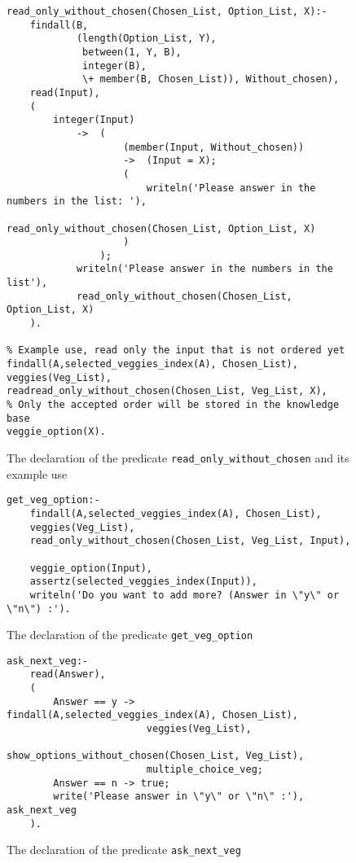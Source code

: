 \documentclass[12pt,a4paper]{article}
\newcommand{\varname}[1]{\texttt{#1}}
\newcommand{\predname}[1]{{\color{MidnightBlue}\varname{#1}}}
\begin{document}
\begin{figure}[H]
	\centering
\begin{lstlisting}[style=Prolog-pygsty]
% Define read_only_without_chosen
read_only_without_chosen(Chosen_List, Option_List, X):- 
    findall(B,
            (length(Option_List, Y),
             between(1, Y, B),
             integer(B),
             \+ member(B, Chosen_List)), Without_chosen),
    read(Input),
    (   
    	integer(Input)
    		->  (   
                	(member(Input, Without_chosen))
    				->  (Input = X);
    				(   
                		writeln('Please answer in the numbers in the list: '),
        				read_only_without_chosen(Chosen_List, Option_List, X)
                	)
                );
    		writeln('Please answer in the numbers in the list'),
        	read_only_without_chosen(Chosen_List, Option_List, X)
    ).
    
% Example use, read only the input that is not ordered yet
findall(A,selected_veggies_index(A), Chosen_List), veggies(Veg_List),
readread_only_without_chosen(Chosen_List, Veg_List, X),
% Only the accepted order will be stored in the knowledge base
veggie_option(X).

\end{lstlisting}
	\caption{The declaration of the predicate \predname{read\_only\_without\_chosen} and its example use} 
	\label{fig:read-without}
\end{figure}

\begin{figure}[H]
	\centering
\begin{lstlisting}[style=Prolog-pygsty]
% Define get_veg_option
get_veg_option:-
    findall(A,selected_veggies_index(A), Chosen_List),
    veggies(Veg_List),
    read_only_without_chosen(Chosen_List, Veg_List, Input),
    
    veggie_option(Input),
    assertz(selected_veggies_index(Input)),
    writeln('Do you want to add more? (Answer in \"y\" or \"n\") :').
\end{lstlisting}
	\caption{The declaration of the predicate \predname{get\_veg\_option}} 
	\label{fig:get-veg-op}
\end{figure}

\begin{figure}[H]
	\centering
\begin{lstlisting}[style=Prolog-pygsty]
% Define ask_next_veg
ask_next_veg:-
	read(Answer),
    (   
    	Answer == y ->  findall(A,selected_veggies_index(A), Chosen_List),
        				veggies(Veg_List),
    					show_options_without_chosen(Chosen_List, Veg_List),
        				multiple_choice_veg;
    	Answer == n -> true;
    	write('Please answer in \"y\" or \"n\" :'), ask_next_veg
    ).
\end{lstlisting}
	\caption{The declaration of the predicate \predname{ask\_next\_veg}} 
	\label{fig:ask-next-veg}
\end{figure}
\end{document}
